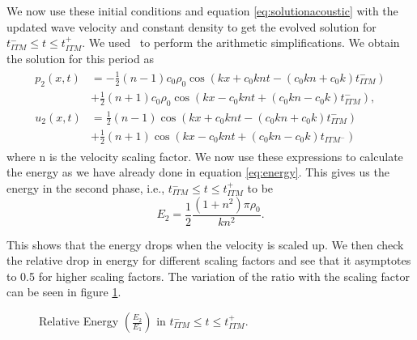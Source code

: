 We now use these initial conditions and equation \ref{eq:solutionacoustic} with the updated wave velocity and constant density to get the evolved solution for $t_{ITM}^- \leq t \leq t_{ITM}^+ $. We used~\parencite{sagemath} to perform the arithmetic simplifications. We obtain the solution for this period as
\begin{align}
    \begin{split}
        p_{2}\left(x, t\right) &= -\frac{1}{2} \left(n-1\right)c_0\rho_0 \cos\left(kx + c_0knt - \left(c_0kn + c_0k\right)t_{ITM}^-\right) \\
        &+ \frac{1}{2} \left(n+1\right)c_0\rho_0\cos\left(kx - c_0knt + \left(c_0kn - c_0k\right)t_{ITM}^-\right), \\
        u_{2}\left(x, t\right) &= \frac{1}{2}\left(n-1\right)\cos\left(kx + c_0knt - \left(c_0kn + c_0k\right)t_{ITM}^-\right)\\
        &+ \frac{1}{2}\left(n+1\right)\cos\left(kx - c_0knt + \left(c_0kn-c_0k\right)t_{ITM^-}\right)
    \end{split}
\end{align}
where n is the velocity scaling factor. We now use these expressions to calculate the energy as we have already done in equation \ref{eq:energy}. This gives us the energy in the second phase, i.e., $t_{ITM}^- \leq t \leq t_{ITM}^+ $ to be
\begin{equation}
    E_2 = \frac{1}{2}\frac{\left(1 + n^2\right)\pi \rho_0}{kn^2} .
\end{equation}

This shows that the energy drops when the velocity is scaled up. We then check the relative drop in energy for different scaling factors and see that it asymptotes to 0.5 for higher scaling factors. The variation of the ratio with the scaling factor can be seen in figure \ref{fig:ratio1}.

\begin{figure}[!htpb]
    \centering
    \caption{Relative Energy $\left(\frac{E_2}{E_1}\right)$ in $t_{ITM}^- \leq t \leq t_{ITM}^+$. }
    \label{fig:ratio1}
\end{figure}

